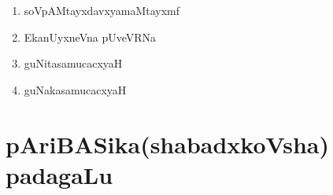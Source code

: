 {\begin{enumerate}[\rm 1)]
\item soVpAMtayxdavxyamaMtayxmf

\item EkanUyxneVna pUveVRNa

\item guNitasamucacxyaH

\item guNakasamucacxyaH
\end{enumerate}

\newpage

\section*{pAriBASika(shabadxkoVsha) padagaLu}

}
